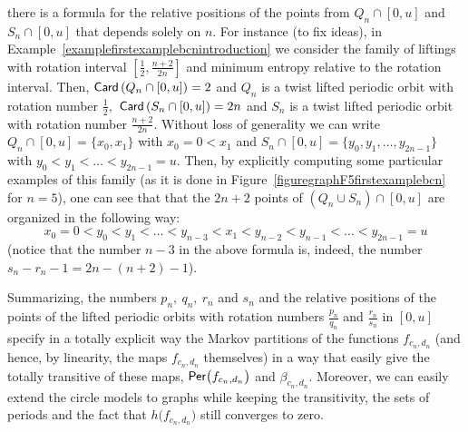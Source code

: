 \documentclass[a4paper, 11pt]{amsart}
\numberwithin{equation}{section}
\theoremstyle{customnumberedtheorem}
\theoremstyle{definitionwithbfnote}
\DeclareMathOperator{\Per}{\textsf{\upshape Per}}
\DeclareMathOperator{\Card}{\textsf{\upshape Card}}
\begin{document}
there is a formula for the relative positions of the points from
$Q_n \cap [0,u]$ and $S_n \cap [0,u]$ that depends solely on $n$.
For instance (to fix ideas),
in Example~\ref{examplefirstexamplebcnintroduction}
we consider the family of liftings with rotation interval
$\left[\tfrac{1}{2}, \tfrac{n+2}{2n}\right]$ and minimum entropy
relative to the rotation interval.
Then, $\Card\left(Q_n \cap [0,u]\right) = 2$
and $Q_n$ is a twist lifted periodic orbit with rotation number
$\tfrac{1}{2},$
$\Card\left(S_n \cap [0,u]\right) = 2n$
and $S_n$ is a twist lifted periodic orbit with rotation number
$\tfrac{n+2}{2n}.$ Without loss of generality we can write
$Q_n \cap [0,u] = \{x_0, x_1\}$ with $x_0 = 0 < x_1$ and
$S_n \cap [0,u] = \{y_0,y_1,\dots,y_{2n-1}\}$ with $y_0 < y_1 < \dots < y_{2n-1} = u.$
Then, by explicitly computing some particular examples of this family
(as it is done in Figure~\ref{figuregraphF5firstexamplebcn} for $n=5$),
one can see that that the $2n+2$ points of $(Q_n \cup S_n) \cap [0,u]$
are organized in the following way:
\[
 x_0 = 0 < y_0 < y_1 < \dots < y_{n-3} < x_1 < y_{n-2} < y_{n-1} < \dots < y_{2n-1} = u
\]
(notice that the number $n-3$ in the above formula is, indeed,
the number $s_n -r_n - 1 = 2n-(n+2)-1$).

Summarizing, the numbers $p_n,\ q_n,\ r_n$ and $s_n$ and the relative
positions of the points of the  lifted periodic orbits with rotation
numbers $\tfrac{p_n}{q_n}$ and $\tfrac{r_n}{s_n}$ in $[0,u]$
specify in a totally explicit way the Markov partitions of the functions
$f_{c_n,d_n}$ (and hence, by linearity, the maps $f_{c_n,d_n}$
themselves) in a way that easily give the totally transitive of
these maps, $\Per\bigl(f_{c_n,d_n}\bigr)$ and $\beta_{c_n,d_n}.$
Moreover, we can easily extend the circle models to graphs while keeping the
transitivity, the sets of periods and the fact that
$h\bigl(f_{c_n,d_n}\bigr)$ still converges to zero.
\end{document}
